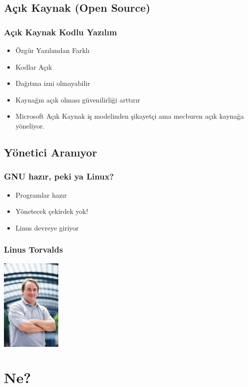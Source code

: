 \documentclass{beamer}
\begin{document}
	\subsection{Açık Kaynak (Open Source)}
		\begin{frame}
		 	\frametitle{Açık Kaynak Kodlu Yazılım}
			\begin{itemize}
			 \item Özgür Yazılımdan Farklı
			 \item Kodlar Açık
			 \item Dağıtma izni olmayabilir
			 \item Kaynağın açık olması güvenilirliği arttırır
			 \item Microsoft Açık Kaynak iş modelinden şikayetçi ama mecburen açık kaynağa yöneliyor.
			\end{itemize}
		\end{frame}
	\subsection{Yönetici Aranıyor}
		\begin{frame}
		 	\frametitle{GNU hazır, peki ya Linux?}
				\begin{itemize}
				\item Programlar hazır
				\item Yönetecek çekirdek yok!
				\item Linus devreye giriyor
				\end{itemize}
		\end{frame}
		\begin{frame}
		 	\frametitle{Linus Torvalds}
				\begin{center}
					\includegraphics{img/linus.jpg}
				\end{center}
		\end{frame}
		



\section{Ne?}
\end{document}
